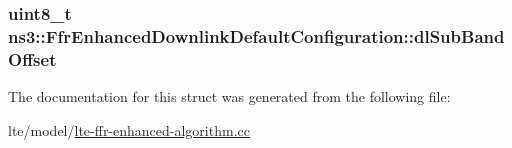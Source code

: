 \subsubsection[{\texorpdfstring{dl\+Sub\+Band\+Offset}{dlSubBandOffset}}]{\setlength{\rightskip}{0pt plus 5cm}uint8\+\_\+t ns3\+::\+Ffr\+Enhanced\+Downlink\+Default\+Configuration\+::dl\+Sub\+Band\+Offset}\hypertarget{structns3_1_1FfrEnhancedDownlinkDefaultConfiguration_adcb873363c6ccc3cd6f679af003f286a}{}\label{structns3_1_1FfrEnhancedDownlinkDefaultConfiguration_adcb873363c6ccc3cd6f679af003f286a}


The documentation for this struct was generated from the following file\+:\begin{DoxyCompactItemize}
\item 
lte/model/\hyperlink{lte-ffr-enhanced-algorithm_8cc}{lte-\/ffr-\/enhanced-\/algorithm.\+cc}\end{DoxyCompactItemize}
